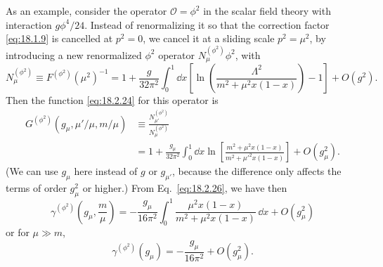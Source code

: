 As an example, consider the operator $\mathcal O=\phi^2$ in the scalar field
theory with interaction $g\phi^4/24$. Instead of renormalizing it so that the
correction factor \eqref{eq:18.1.9} is cancelled at $p^2=0$, we cancel it at a
sliding scale $p^2=\mu^2$, by introducing a new renormalized $\phi^2$ operator
$N_\mu^{(\phi^2)}\phi^2$, with
\[
N_\mu^{(\phi^2)}\equiv F^{(\phi^2)}(\mu^2)^{-1}
=1+\frac{g}{32\pi^2}\int_0^1\dd x
\left[\ln\left(\frac{\Lambda^2}{m^2+\mu^2x(1-x)}\right)-1\right]
+O(g^2).
\]
Then the function \eqref{eq:18.2.24} for this operator is
\[
\begin{aligned}
G^{(\phi^2)}(g_\mu,\mu'/\mu,m/\mu)
&\equiv\frac{N_{\mu'}^{(\phi^2)}}{N_\mu^{(\phi^2)}}\\
&=1+\frac{g_\mu}{32\pi^2}\int_0^1\dd x
\ln\left[\frac{m^2+\mu^2x(1-x)}{m^2+\mu'^2x(1-x)}\right]
+O(g_\mu^2).
\end{aligned}
\]
(We can use $g_\mu$ here instead of $g$ or $g_{\mu'}$, because the difference
only affects the terms of order $g_\mu^2$ or higher.) From
Eq.~\eqref{eq:18.2.26}, we have then
\[
\gamma^{(\phi^2)}\left(g_\mu,\frac{m}{\mu}\right)
=-\frac{g_\mu}{16\pi^2}\int_0^1
\frac{\mu^2x(1-x)}{m^2+\mu^2x(1-x)}\,\dd x+O(g_\mu^2)
\]
or for $\mu\gg m$,
\begin{equation}
\gamma^{(\phi^2)}(g_\mu)=-\frac{g_\mu}{16\pi^2}+O(g_\mu^2).
\tag{18.2.29}\label{eq:18.2.29}
\end{equation}
\par\noindent

